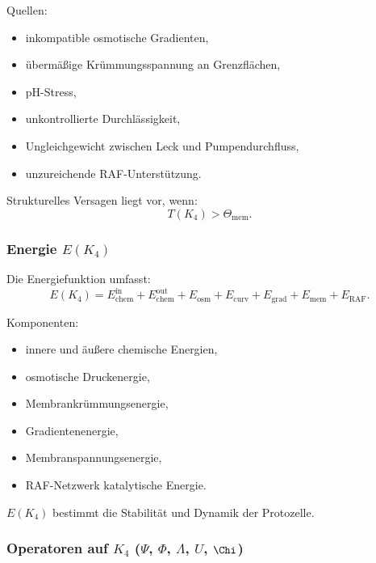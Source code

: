 Quellen:
\begin{itemize}
    \item inkompatible osmotische Gradienten,
    \item übermäßige Krümmungsspannung an Grenzflächen,
    \item pH-Stress,
    \item unkontrollierte Durchlässigkeit,
    \item Ungleichgewicht zwischen Leck und Pumpendurchfluss,
    \item unzureichende RAF-Unterstützung.
\end{itemize}

Strukturelles Versagen liegt vor, wenn:
\[
T(K_4) > \Theta_{\mathrm{mem}}.
\]

\subsubsection{Energie \texorpdfstring{$E(K_4)$}{E(K_4)}}

Die Energiefunktion umfasst:
\[
E(K_4) =
E_{\mathrm{chem}}^{\mathrm{in}} + E_{\mathrm{chem}}^{\mathrm{out}}
+ E_{\mathrm{osm}} + E_{\mathrm{curv}}
+ E_{\mathrm{grad}} + E_{\mathrm{mem}}
+ E_{\mathrm{RAF}}.
\]

Komponenten:
\begin{itemize}
    \item innere und äußere chemische Energien,
    \item osmotische Druckenergie,
    \item Membrankrümmungsenergie,
    \item Gradientenenergie,
    \item Membranspannungsenergie,
    \item RAF-Netzwerk katalytische Energie.
\end{itemize}

$E(K_4)$ bestimmt die Stabilität und Dynamik der Protozelle.

\subsubsection{Operatoren auf \texorpdfstring{$K_4$}{K_4} (\texorpdfstring{$\Psi$}{\Psi}, \texorpdfstring{$\Phi$}{\Phi}, \texorpdfstring{$\Lambda$}{\Lambda}, \texorpdfstring{$U$}{U}, \texorpdfstring{$\Chi$}{\Chi})}

